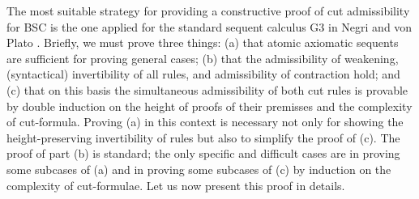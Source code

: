 \documentclass[10pt,a4paper]{article}
\theoremstyle{definition}
\newcommand{\3}{\vspace{.3in}}
\newcommand{\2}{\vspace{.2in}}
\newcommand{\1}{\vspace{.1in}}
\newcommand{\5}{\vspace{.05in}}
\begin{document}
The most suitable strategy for providing a constructive proof of cut admissibility for BSC is the one applied for the standard sequent calculus G3 in Negri and von Plato \cite{neg:str01}. Briefly, we must prove three things: (a) that atomic axiomatic sequents are sufficient for proving general cases; (b) that the admissibility of weakening, (syntactical) invertibility of all rules, and admissibility of contraction hold; and (c) that on this basis the simultaneous admissibility of both cut rules is provable by double induction on the height of proofs of their premisses and the complexity of cut-formula. Proving (a) in this context is necessary not only for showing the height-preserving invertibility of rules but also to simplify the proof of (c). 
The proof of part (b) is standard; the only specific and difficult cases are in proving some subcases of (a) and in proving some subcases of (c) by induction on the complexity of cut-formulae. Let us now present this proof in details.
\end{document}

